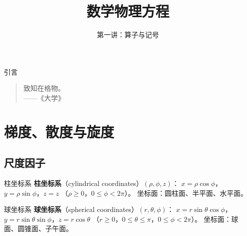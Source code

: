 \documentclass[fontset=windows, chinese, 10pt, xcolor=dvipsnames]{beamer}
\title{数学物理方程}
\subtitle{第一讲：算子与记号}
\begin{document}
\begin{frame}
  \titlepage
\end{frame}

\begin{frame}{引言}
  \begin{quote}
    致知在格物。\\
    \hfill ——《大学》
  \end{quote}

\end{frame}

\section{梯度、散度与旋度}

\subsection{尺度因子}

\begin{frame}{柱坐标系}
  \textbf{柱坐标系}（cylindrical coordinates）$(\rho,\phi,z)$：
  $x=\rho\cos\phi$，$y=\rho\sin\phi$，$z=z$
  （$\rho\geq 0$，$0\leq\phi<2\pi$）。
  坐标面：圆柱面、半平面、水平面。
  \vspace{-0.2em}
  \begin{center}
    \scalebox{0.95}{}
  \end{center}
\end{frame}

\begin{frame}{球坐标系}
  \textbf{球坐标系}（spherical coordinates）$(r,\theta,\phi)$：
  $x=r\sin\theta\cos\phi$，$y=r\sin\theta\sin\phi$，$z=r\cos\theta$
  （$r\geq 0$，$0\leq\theta\leq\pi$，$0\leq\phi<2\pi$）。
  坐标面：球面、圆锥面、子午面。
  \vspace{-0.2em}
  \begin{center}
    \scalebox{0.95}{}
  \end{center}
\end{frame}
\end{document}
